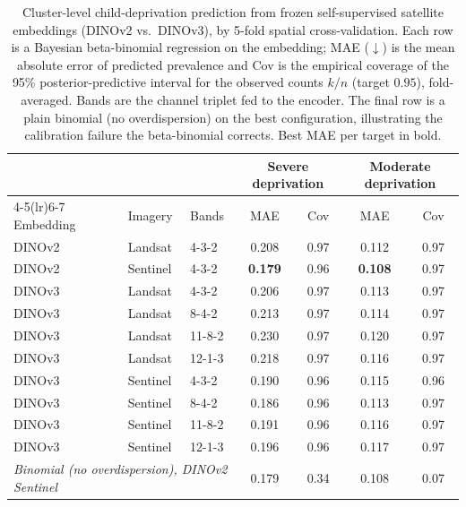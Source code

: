 \begin{table}[t]
\centering
\caption{Cluster-level child-deprivation prediction from frozen self-supervised satellite embeddings (DINOv2 vs.\ DINOv3), by 5-fold spatial cross-validation. Each row is a Bayesian beta-binomial regression on the embedding; MAE ($\downarrow$) is the mean absolute error of predicted prevalence and Cov is the empirical coverage of the 95\% posterior-predictive interval for the observed counts $k/n$ (target $0.95$), fold-averaged. Bands are the channel triplet fed to the encoder. The final row is a plain binomial (no overdispersion) on the best configuration, illustrating the calibration failure the beta-binomial corrects. Best MAE per target in bold.}
\label{tab:betabinom}
\begin{tabular}{lll cc cc}
\toprule
 & & & \multicolumn{2}{c}{Severe deprivation} & \multicolumn{2}{c}{Moderate deprivation}\\
\cmidrule(lr){4-5}\cmidrule(lr){6-7}
Embedding & Imagery & Bands & MAE & Cov & MAE & Cov\\
\midrule
DINOv2 & Landsat & 4-3-2 & 0.208 & 0.97 & 0.112 & 0.97\\
\addlinespace
DINOv2 & Sentinel & 4-3-2 & \textbf{0.179} & 0.96 & \textbf{0.108} & 0.97\\
\addlinespace
DINOv3 & Landsat & 4-3-2 & 0.206 & 0.97 & 0.113 & 0.97\\
DINOv3 & Landsat & 8-4-2 & 0.213 & 0.97 & 0.114 & 0.97\\
DINOv3 & Landsat & 11-8-2 & 0.230 & 0.97 & 0.120 & 0.97\\
DINOv3 & Landsat & 12-1-3 & 0.218 & 0.97 & 0.116 & 0.97\\
\addlinespace
DINOv3 & Sentinel & 4-3-2 & 0.190 & 0.96 & 0.115 & 0.96\\
DINOv3 & Sentinel & 8-4-2 & 0.186 & 0.96 & 0.113 & 0.97\\
DINOv3 & Sentinel & 11-8-2 & 0.191 & 0.96 & 0.116 & 0.97\\
DINOv3 & Sentinel & 12-1-3 & 0.196 & 0.96 & 0.117 & 0.97\\
\midrule
\multicolumn{3}{l}{\textit{Binomial (no overdispersion), DINOv2 Sentinel}} & 0.179 & 0.34 & 0.108 & 0.07\\
\bottomrule
\end{tabular}
\end{table}
